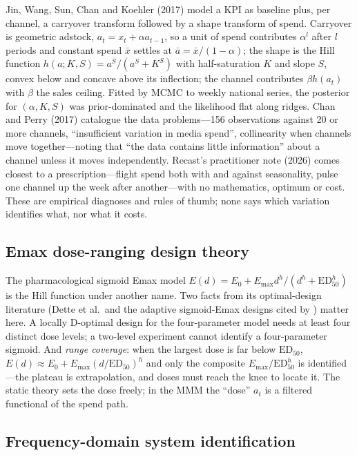 Jin, Wang, Sun, Chan and Koehler (2017) model a KPI as baseline plus, per channel, a carryover transform followed by a shape transform of spend. Carryover is geometric adstock, $a_t = x_t + \alpha a_{t-1}$, so a unit of spend contributes $\alpha^l$ after $l$ periods and constant spend $\bar x$ settles at $\bar a = \bar x/(1-\alpha)$; the shape is the Hill function $h(a; K, S) = a^S/(a^S + K^S)$ with half-saturation $K$ and slope $S$, convex below and concave above its inflection; the channel contributes $\beta h(a_t)$ with $\beta$ the sales ceiling. Fitted by MCMC to weekly national series, the posterior for $(\alpha, K, S)$ was prior-dominated and the likelihood flat along ridges. Chan and Perry (2017) catalogue the data problems---156 observations against 20 or more channels, ``insufficient variation in media spend'', collinearity when channels move together---noting that ``the data contains little information'' about a channel unless it moves independently. Recast's practitioner note (2026) comes closest to a prescription---flight spend both with and against seasonality, pulse one channel up the week after another---with no mathematics, optimum or cost. These are empirical diagnoses and rules of thumb; none says which variation identifies what, nor what it costs.

\subsection{Emax dose-ranging design theory}

The pharmacological sigmoid Emax model $E(d) = E_0 + E_{\max}d^h/(d^h + \mathrm{ED}_{50}^h)$ is the Hill function under another name. Two facts from its optimal-design literature (Dette et al.\ and the adaptive sigmoid-Emax designs cited by ) matter here. A locally D-optimal design for the four-parameter model needs at least four distinct dose levels; a two-level experiment cannot identify a four-parameter sigmoid. And \emph{range coverage}: when the largest dose is far below $\mathrm{ED}_{50}$, $E(d) \approx E_0 + E_{\max}(d/\mathrm{ED}_{50})^h$ and only the composite $E_{\max}/\mathrm{ED}_{50}^h$ is identified---the plateau is extrapolation, and doses must reach the knee to locate it. The static theory sets the dose freely; in the MMM the ``dose'' $a_t$ is a filtered functional of the spend path.

\subsection{Frequency-domain system identification}


